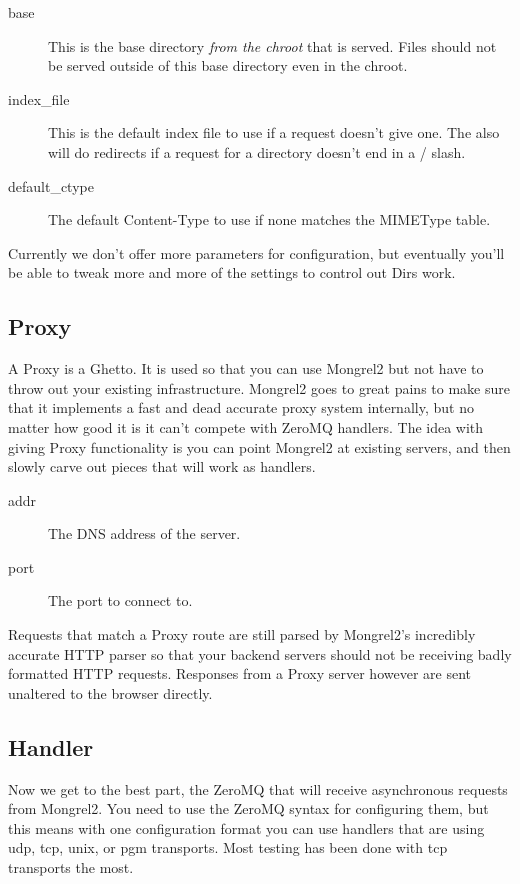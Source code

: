 \begin{description}
\item[base]  This is the base directory \emph{from the chroot} that is served.  Files should not
    be served outside of this base directory even in the chroot.
\item[index_file] This is the default index file to use if a request doesn't give one.  The 
    also will do redirects if a request for a directory doesn't end in a / slash.
\item[default_ctype] The default Content-Type to use if none matches the MIMEType table.
\end{description}

Currently we don't offer more parameters for configuration, but eventually you'll be able to tweak more and
more of the settings to control out Dirs work.

\subsection{Proxy}

A Proxy is a Ghetto.  It is used so that you can use Mongrel2 but not have to throw
out your existing infrastructure.  Mongrel2 goes to great pains to make sure that it
implements a fast and dead accurate proxy system internally, but no matter how good it
is it can't compete with ZeroMQ handlers.  The idea with giving Proxy functionality is
you can point Mongrel2 at existing servers, and then slowly carve out pieces that 
will work as handlers.


\begin{description}
\item[addr] The DNS address of the server.
\item[port] The port to connect to.
\end{description}

Requests that match a Proxy route are still parsed by Mongrel2's incredibly accurate
HTTP parser so that your backend servers should not be receiving badly formatted
HTTP requests.  Responses from a Proxy server however are sent unaltered to the
browser directly.


\subsection{Handler}

Now we get to the best part, the ZeroMQ  that will receive asynchronous requests
from Mongrel2.  You need to use the ZeroMQ syntax for configuring them, but this means with one
configuration format you can use handlers that are using udp, tcp, unix, or pgm transports.  Most
testing has been done with tcp transports the most.

